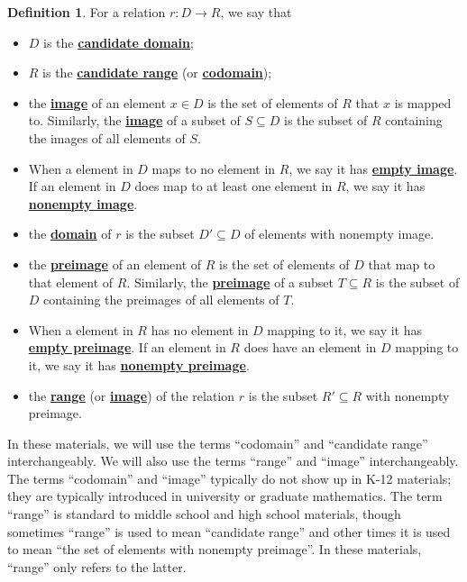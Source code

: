 \documentclass[11pt]{article}
\renewcommand\subset\subseteq
\renewcommand\emph[1]{\underline{\bf{#1}}} %
\theoremstyle{definition}
\newtheorem{definition}[theorem]{Definition}
\begin{document}
\begin{definition}\label{d: candidate domain etc}
For a relation $r:D \to R$, we say that 
	\begin{itemize}
	\item $D$ is the \emph{candidate domain};
	\item $R$ is the \emph{candidate range} (or \emph{codomain});
	\item the \emph{image} of an element $x\in  D$ is the set of elements of $R$ that $x$ is mapped to. Similarly, the \emph{image} of a subset of $S\subset D$ is the subset of $R$ containing the images of all elements of $S$.
	\item When a element in $D$ maps to no element in $R$, we say it has \emph{empty image}. If an element in $D$ does map to at least one element in $R$, we say it has \emph{nonempty image}.
	\item the \emph{domain} of $r$ is the subset $D'\subset D$ of elements with nonempty image.
	\item the \emph{preimage} of an element of $R$ is the set of elements of $D$ that map to that element of $R$. Similarly, the \emph{preimage} of a subset $T\subset R$ is the subset of $D$ containing the preimages of all elements of $T$.
	\item When a element in $R$ has no element in $D$ mapping to it, we say it has \emph{empty preimage}. If an element in $R$ does have an element in $D$ mapping to it, we say it has \emph{nonempty preimage}.
	\item the \emph{range} (or \emph{image}) of the relation $r$ is the subset $R'\subset R$ with nonempty preimage.
	\end{itemize}
\end{definition}

\begin{note}
In these materials, we will use the terms ``codomain'' and ``candidate range'' interchangeably. We will also use the terms ``range'' and ``image'' interchangeably. The terms ``codomain'' and ``image'' typically do not show up in K-12 materials; they are typically introduced in university or graduate mathematics. The term ``range'' is standard to middle school and high school materials, though sometimes ``range'' is used to mean ``candidate range'' and other times it is used to mean ``the set of elements with nonempty preimage''. In these materials, ``range'' only refers to the latter.
\end{note}
\end{document}
